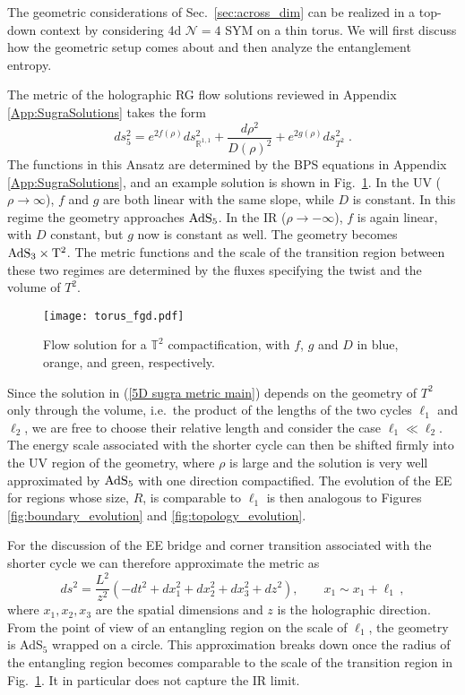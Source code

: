 \documentclass[11 pt]{article}
\def\RR{{\mathds{R}}}
\begin{document}
The geometric considerations of Sec.~\ref{sec:across_dim} can be realized in a top-down context by considering 4d $\mathcal N=4$ SYM on a thin torus. We will first discuss how the geometric setup comes about and then analyze the entanglement entropy.

The metric of the holographic RG flow solutions reviewed in Appendix \ref{App:SugraSolutions} takes the form
\begin{equation} \label{5D sugra metric main}
    ds_5^2=e^{2f(\rho)}ds^2_{\RR^{1,1}} + \frac{d\rho^2}{D(\rho)^2} + e^{2g(\rho)}ds^2_{T^2}\; .
\end{equation}
The functions in this Ansatz are determined by the BPS equations in Appendix \ref{App:SugraSolutions}, and an example solution is shown in Fig.~\ref{fig:torus_fgd-main}.
In the UV ($\rho\rightarrow\infty$), $f$ and $g$ are both linear with the same slope, while $D$ is constant. In this regime the geometry approaches $\rm AdS_5$. In the IR ($\rho\rightarrow-\infty$), $f$ is again linear, with $D$ constant, but $g$ now is constant as well. The geometry becomes $\rm AdS_3\times T^2$. The metric functions and the scale of the transition region between these two regimes are determined by the fluxes specifying the twist and the volume of $T^2$.


\begin{figure}
    \centering
    \texttt{[image: torus\_fgd.pdf]}
    \caption{Flow solution for a $\mathbb{T}^2$ compactification, with $f$, $g$ and $D$ in blue, orange, and green, respectively.}
    \label{fig:torus_fgd-main}
\end{figure}

Since the solution in (\ref{5D sugra metric main}) depends on the geometry of $T^2$ only through the volume, i.e.\ the product of the lengths of the two cycles $\ell_1$ and $\ell_2$, we are free to choose their relative length and consider the case $\ell_1\ll \ell_2$. The energy scale associated with the shorter cycle can then be shifted firmly into the UV region of the geometry, where $\rho$ is large and the solution is very well approximated by $\rm AdS_5$ with one direction compactified. The evolution of the EE for regions whose size, $R$, is comparable to $\ell_1$ is then analogous to Figures \ref{fig:boundary_evolution} and \ref{fig:topology_evolution}.

For the discussion of the EE bridge and corner transition associated with the shorter cycle we can therefore approximate the metric as 
\begin{equation}\label{periodic_ads_metric}
    ds^2 = \frac{L^2}{z^2}\left(-dt^2+dx_1^2+dx_2^2+dx_3^2+dz^2\right), \qquad x_1\sim x_1+\ell_1\,, 
\end{equation}
where $x_1,x_2, x_3$ are the spatial dimensions and $z$ is the holographic direction. From the point of view of an entangling region on the scale of $\ell_1$, the geometry is AdS$_5$ wrapped on a circle. This approximation breaks down once the radius of the entangling region becomes comparable to the scale of the transition region in Fig.~\ref{fig:torus_fgd-main}.  It in particular does not capture the IR limit.
\end{document}
